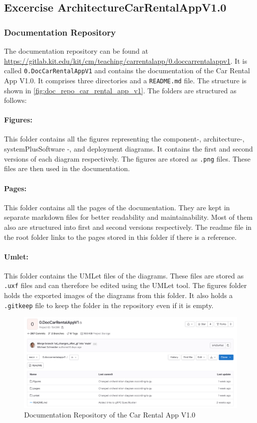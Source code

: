 \subsection{Excercise ArchitectureCarRentalAppV1.0}
\label{sec:architecture_car_rental_app_v1_0}
\subsubsection*{Documentation Repository}
The documentation repository can be found at \url{https://gitlab.kit.edu/kit/cm/teaching/carrentalapp/0.doccarrentalappv1}.
It is called \texttt{0.DocCarRentalAppV1} and contains the documentation of the Car Rental App V1.0.
It comprises three directories and a \texttt{README.md} file.
The structure is shown in \autoref{fig:doc_repo_car_rental_app_v1}.
The folders are structured as follows:

\paragraph*{Figures:}
This folder contains all the figures representing the component-, architecture-, systemPlusSoftware -, and deployment diagrams.
It contains the first and second versions of each diagram respectively.
The figures are stored as \texttt{.png} files.
These files are then used in the documentation.
\paragraph*{Pages:}
This folder contains all the pages of the documentation.
They are kept in separate markdown files for better readability and maintainability.
Most of them also are structured into first and second versions respectively.
The readme file in the root folder links to the pages stored in this folder if there is a reference.
\paragraph*{Umlet:}
This folder contains the UMLet files of the diagrams.
These files are stored as \texttt{.uxf} files and can therefore be edited using the UMLet tool.
The figures folder holds the exported images of the diagrams from this folder.
It also holds a \texttt{.gitkeep} file to keep the folder in the repository even if it is empty.

\begin{figure}
    \centering
    \includegraphics[width=\textwidth]{figures/microservices/introduction/ms_intro_docRepo.png}
    \caption{Documentation Repository of the Car Rental App V1.0}
    \label{fig:doc_repo_car_rental_app_v1}
\end{figure}


